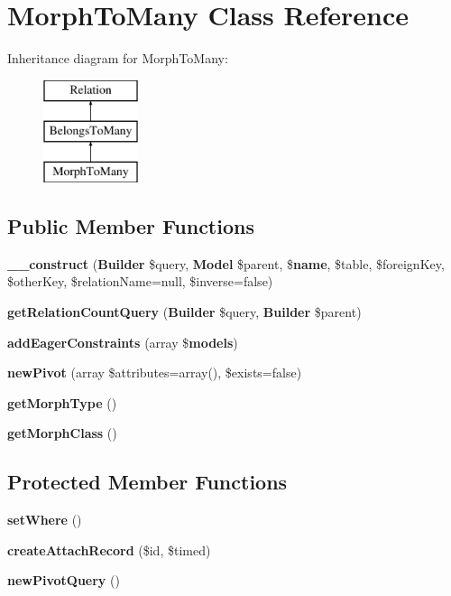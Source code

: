 \section{Morph\+To\+Many Class Reference}
\label{class_illuminate_1_1_database_1_1_eloquent_1_1_relations_1_1_morph_to_many}
Inheritance diagram for Morph\+To\+Many\+:\begin{figure}[H]
\begin{center}
\leavevmode
\includegraphics[height=3.000000cm]{class_illuminate_1_1_database_1_1_eloquent_1_1_relations_1_1_morph_to_many}
\end{center}
\end{figure}
\subsection*{Public Member Functions}
\begin{DoxyCompactItemize}
\item 
{\bf \+\_\+\+\_\+construct} ({\bf Builder} \$query, {\bf Model} \$parent, \${\bf name}, \$table, \$foreign\+Key, \$other\+Key, \$relation\+Name=null, \$inverse=false)
\item 
{\bf get\+Relation\+Count\+Query} ({\bf Builder} \$query, {\bf Builder} \$parent)
\item 
{\bf add\+Eager\+Constraints} (array \${\bf models})
\item 
{\bf new\+Pivot} (array \$attributes=array(), \$exists=false)
\item 
{\bf get\+Morph\+Type} ()
\item 
{\bf get\+Morph\+Class} ()
\end{DoxyCompactItemize}
\subsection*{Protected Member Functions}
\begin{DoxyCompactItemize}
\item 
{\bf set\+Where} ()
\item 
{\bf create\+Attach\+Record} (\$id, \$timed)
\item 
{\bf new\+Pivot\+Query} ()
\end{DoxyCompactItemize}
